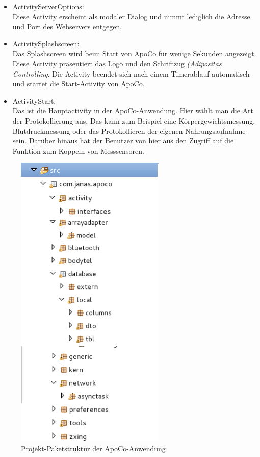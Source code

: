 \begin{itemize}
 \item ActivityServerOptions:\\
 Diese Activity erscheint als modaler Dialog und nimmt lediglich die Adresse und Port des Webservers entgegen.
 
 \item ActivitySplashscreen:\\
 Das Splashscreen wird beim Start von ApoCo f\"ur wenige Sekunden angezeigt.
 Diese Activity pr\"asentiert das Logo und den Schriftzug \emph{(Adipositas Controlling}.
 Die Activity beendet sich nach einem Timerablauf automatisch und startet die Start-Activity von ApoCo.

 \item ActivityStart:\\
 Das ist die Hauptactivity in der ApoCo-Anwendung.
 Hier w\"ahlt man die Art der Protokollierung aus.
 Das kann zum Beispiel eine K\"orpergewichtsmessung, Blutdruckmessung oder das Protokollieren der eigenen Nahrungsaufnahme sein.
 Dar\"uber hinaus hat der Benutzer von hier aus den Zugriff auf die Funktion zum Koppeln von Messsensoren.

\end{itemize}



\begin{figure}[h]
  \centering
  \includegraphics[scale=0.7]{screenshots/kapitel4/projekt_struktur/projekt_struktur_pakete.png}
  \caption{Projekt-Paketstruktur der ApoCo-Anwendung}
  
\end{figure}

